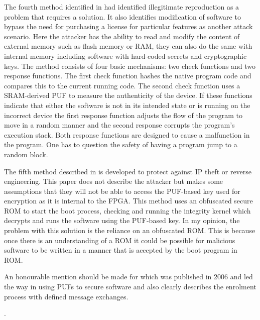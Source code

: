 The fourth method identified in \cite{Kohnhauser2015} had identified illegitimate reproduction as a problem that requires a solution. It also identifies modification of software to bypass the need for purchasing a license for particular features as another attack scenario. Here the attacker has the ability to read and modify the content of external memory such as flash memory or RAM, they can also do the same with internal memory including software with hard-coded secrets and cryptographic keys. The method consists of four basic mechanisms: two check functions and two response functions. The first check function hashes the native program code and compares this to the current running code. The second check function uses a SRAM-derived PUF to measure the authenticity of the device. If these functions indicate that either the software is not in its intended state or is running on the incorrect device the first response function adjusts the flow of the program to move in a random manner and the second response corrupts the program's execution stack. Both response functions are designed to cause a malfunction in the program. One has to question the safety of having a program jump to a random block.


The fifth method described in \cite{Gora2010} is developed to protect against IP theft or reverse engineering. This paper does not describe the attacker but makes some assumptions that they will not be able to access the PUF-based key used for encryption as it is internal to the FPGA. This method uses an obfuscated secure ROM to start the boot process, checking and running the integrity kernel which decrypts and runs the software using the PUF-based key. In my opinion, the problem with this solution is the reliance on an obfuscated ROM. This is because once there is an understanding of a ROM it could be possible for malicious software to be written in a manner that is accepted by the boot program in ROM.

\ifnotesincluded
{}
\fi

An honourable mention should be made for \cite{Simpson2006} which was published in 2006 and led the way in using PUFs to secure software and also clearly describes the enrolment process with defined message exchanges.

\ifnotesincluded
{}.
\fi



